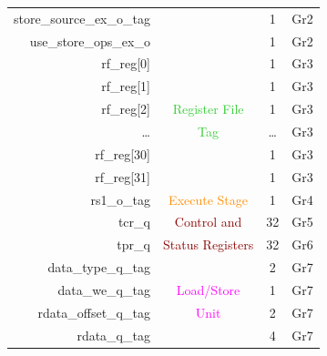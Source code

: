 \begin{table}[t]
\begin{tabular}{@{}rccc@{}}
        store\_source\_ex\_o\_tag       &                                       & 1      & Gr2                         \\
        use\_store\_ops\_ex\_o          &                                       & 1      & Gr2                         \\\hdashline
        rf\_reg[0]                      &                                       & 1      & Gr3                         \\
        rf\_reg[1]                      &                                       & 1      & Gr3                         \\
        rf\_reg[2]                      & \textcolor{LimeGreen}{Register File}  & 1      & Gr3                         \\
        \ldots                          & \textcolor{LimeGreen}{Tag}            & \ldots & Gr3                         \\
        rf\_reg[30]                     &                                       & 1      & Gr3                         \\
        rf\_reg[31]                     &                                       & 1      & Gr3                         \\\hdashline
        rs1\_o\_tag                     & \textcolor{DarkOrange}{Execute Stage} & 1      & Gr4                         \\\hdashline
        tcr\_q                          & \textcolor{DarkRed}{Control and}      & 32     & Gr5                         \\
        tpr\_q                          & \textcolor{DarkRed}{Status Registers} & 32     & Gr6                         \\\hdashline
        data\_type\_q\_tag              &                                       & 2      & Gr7                         \\
        data\_we\_q\_tag                & \textcolor{magenta}{Load/Store}       & 1      & Gr7                         \\
        rdata\_offset\_q\_tag           & \textcolor{magenta}{Unit}             & 2      & Gr7                         \\
        rdata\_q\_tag                   &                                       & 4      & Gr7                         \\
        \bottomrule
    \end{tabular}
\end{table}

